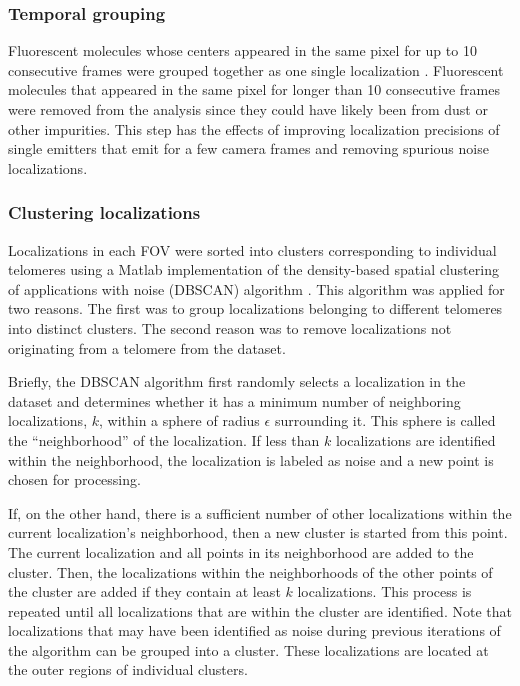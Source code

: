 \documentclass[12pt, a4paper]{article}
\begin{document}
\subsubsection{Temporal grouping}
\label{sec-1-2-1}
Fluorescent molecules whose centers appeared in the same pixel for
up to 10 consecutive frames were grouped together as one single
localization \cite{annibale-natmethods-2011}. Fluorescent
molecules that appeared in the same pixel for longer than 10
consecutive frames were removed from the analysis since they could
have likely been from dust or other impurities. This step has the
effects of improving localization precisions of single emitters
that emit for a few camera frames and removing spurious noise
localizations.

\subsubsection{Clustering localizations}
\label{sec-1-2-2}
Localizations in each FOV were sorted into clusters corresponding
to individual telomeres using a Matlab implementation of the
density-based spatial clustering of applications with noise
(DBSCAN) algorithm
\cite{daszykowski-chemometrintelllab-2001}. This algorithm was
applied for two reasons. The first was to group localizations
belonging to different telomeres into distinct clusters. The
second reason was to remove localizations not originating from a
telomere from the dataset.

Briefly, the DBSCAN algorithm first randomly selects a
localization in the dataset and determines whether it has a
minimum number of neighboring localizations, $k$, within a sphere
of radius $\epsilon$ surrounding it. This sphere is called the
``neighborhood'' of the localization. If less than $k$
localizations are identified within the neighborhood, the
localization is labeled as noise and a new point is chosen for
processing.

If, on the other hand, there is a sufficient number of other
localizations within the current localization's neighborhood, then
a new cluster is started from this point. The current localization
and all points in its neighborhood are added to the cluster. Then,
the localizations within the neighborhoods of the other points of
the cluster are added if they contain at least $k$
localizations. This process is repeated until all localizations
that are within the cluster are identified. Note that
localizations that may have been identified as noise during
previous iterations of the algorithm can be grouped into a
cluster. These localizations are located at the outer regions of
individual clusters.
\end{document}
